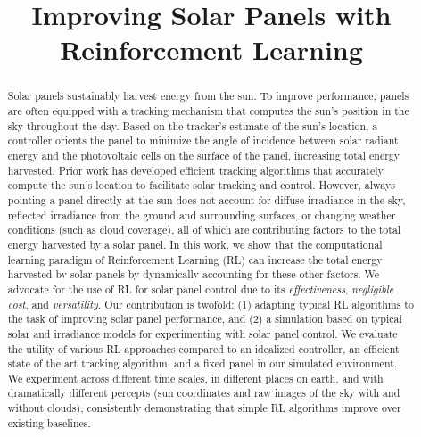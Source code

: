 \documentclass{article}
\title{Improving Solar Panels with Reinforcement Learning}
\begin{document}
\maketitle

\begin{abstract}
Solar panels sustainably harvest energy from the sun. To improve performance, panels are often equipped with a tracking mechanism that computes the sun's position in the sky throughout the day. Based on the tracker's estimate of the sun's location, a controller orients the panel to minimize the angle of incidence between solar radiant energy and the photovoltaic cells on the surface of the panel, increasing total energy harvested. Prior work has developed efficient tracking algorithms that accurately compute the sun's location to facilitate solar tracking and control.
%
However, always pointing a panel directly at the sun does not account for diffuse irradiance in the sky, reflected irradiance from the ground and surrounding surfaces, or changing weather conditions (such as cloud coverage), all of which are contributing factors to the total energy harvested by a solar panel.
%
In this work, we show that the computational learning paradigm of Reinforcement Learning (RL) can increase the total energy harvested by solar panels by dynamically accounting for these other factors. We advocate for the use of RL for solar panel control due to its {\it effectiveness}, {\it negligible cost}, and {\it versatility}. Our contribution is twofold: (1) adapting typical RL algorithms to the task of improving solar panel performance, and (2) a simulation based on typical solar and irradiance models for experimenting with solar panel control.
%
We evaluate the utility of various RL approaches compared to an idealized controller, an efficient state of the art tracking algorithm, and a fixed panel in our simulated environment. We experiment across different time scales, in different places on earth, and with dramatically different percepts (sun coordinates and raw images of the sky with and without clouds), consistently demonstrating that simple RL algorithms improve over existing baselines.
\end{abstract}


\end{document}
